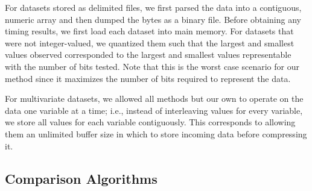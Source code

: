 
For datasets stored as delimited files, we first parsed the data into a contiguous, numeric array and then dumped the bytes as a binary file. Before obtaining any timing results, we first load each dataset into main memory.
For datasets that were not integer-valued, we quantized them such that the largest and smallest values observed corresponded to the largest and smallest values representable with the number of bits tested. Note that this is the worst case scenario for our method since it maximizes the number of bits required to represent the data.

For multivariate datasets, we allowed all methods but our own to operate on the data one variable at a time; i.e., instead of interleaving values for every variable, we store all values for each variable contiguously. This corresponds to allowing them an unlimited buffer size in which to store incoming data before compressing it.


\subsection{Comparison Algorithms}

